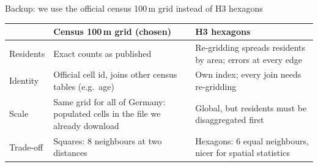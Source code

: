 \documentclass[aspectratio=169,10pt]{beamer}
\begin{document}
\begin{frame}{Backup: we use the official census 100\,m grid instead of H3 hexagons}
  \footnotesize
  \begin{tabular}{@{}P{20mm}P{57mm}P{55mm}@{}}
    \toprule
    & \textbf{Census 100\,m grid (chosen)} & H3 hexagons \\
    \midrule
    Residents & Exact counts as published & Re-gridding spreads residents by area; errors at
      every edge \\
    Identity & Official cell id, joins other census tables (e.g.\ age) & Own index; every join
      needs re-gridding \\
    Scale & Same grid for all of Germany: \factDeCells{} populated cells in the file we already
      download & Global, but residents must be disaggregated first \\
    Trade-off & Squares: 8 neighbours at two distances & Hexagons: 6 equal neighbours, nicer
      for spatial statistics \\
    \bottomrule
  \end{tabular}
\end{frame}
\end{document}

